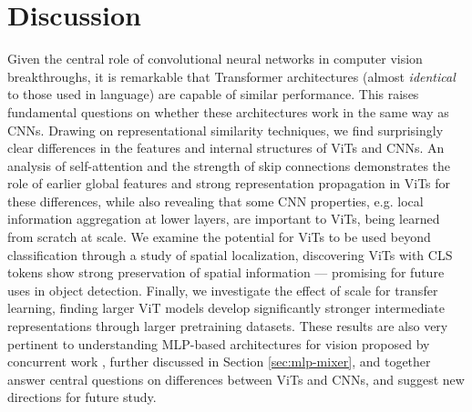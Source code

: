 \documentclass{article}
\begin{document}
\section{Discussion}
\label{sec:discussion}

Given the central role of convolutional neural networks in computer vision breakthroughs, it is remarkable that Transformer architectures (almost \textit{identical} to those used in language) are capable of similar performance. This raises fundamental questions on whether these architectures work in the same way as CNNs. Drawing on representational similarity techniques, we find surprisingly clear differences in the features and internal structures of ViTs and CNNs. An analysis of self-attention and the strength of skip connections demonstrates the role of earlier global features and strong representation propagation in ViTs for these differences, while also revealing that some CNN properties, e.g. local information aggregation at lower layers, are important to ViTs, being learned from scratch at scale. We examine the potential for ViTs to be used beyond classification through a study of spatial localization, discovering ViTs with CLS tokens show strong preservation of spatial information --- promising for future uses in object detection. Finally, we investigate the effect of scale for transfer learning, finding larger ViT models develop significantly stronger intermediate representations through larger pretraining datasets. These results are also very pertinent to understanding MLP-based architectures for vision proposed by concurrent work \cite{tolstikhin2021mlp, touvron2021resmlp}, further discussed in Section \ref{sec:mlp-mixer}, and together answer central questions on differences between ViTs and CNNs, and suggest new directions for future study.


\end{document}
